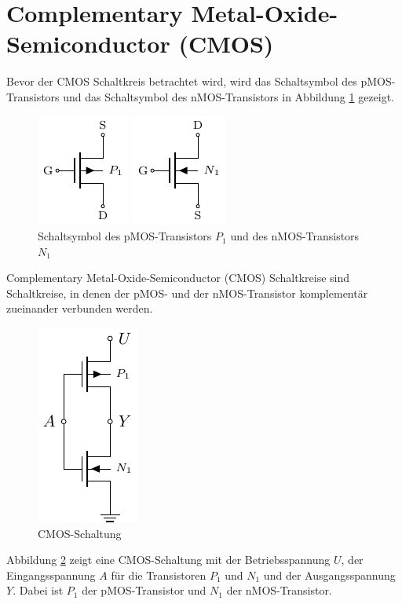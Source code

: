 \documentclass{scrarticle}
\numberwithin{equation}{section}
\begin{document}
\section{Complementary Metal-Oxide-Semiconductor (CMOS)}
\label{sec:cmos}
Bevor der CMOS Schaltkreis betrachtet wird, wird das Schaltsymbol des pMOS-Transistors und das Schaltsymbol des nMOS-Transistors in Abbildung \ref{fig:pmos-nmos} gezeigt.
\begin{figure}[ht]
	\centering
	\begin{minipage}[t]{0.45\textwidth}
		\centering
		\includegraphics[scale=2.2]{tkiz/pmos.pdf}
	\end{minipage}
	\hfill
	\begin{minipage}[t]{0.45\textwidth}
		\centering
		\includegraphics[scale=2.2]{tkiz/nmos.pdf}
	\end{minipage}
	\caption{Schaltsymbol des pMOS-Transistors $P_1$ und des nMOS-Transistors $N_1$}
	\label{fig:pmos-nmos}
\end{figure}

Complementary Metal-Oxide-Semiconductor (CMOS) Schaltkreise sind Schaltkreise, in denen der pMOS- und der nMOS-Transistor komplementär zueinander verbunden werden.
\begin{figure}[h]
	\centering
	\label{fig:cmos-not}
	\includegraphics[scale=1.7]{tkiz/cmos-not.pdf}
	\caption{CMOS-Schaltung}
\end{figure}
Abbildung \ref*{fig:cmos-not} zeigt eine CMOS-Schaltung mit der Betriebsspannung $U$, der Eingangsspannung $A$ für die Transistoren $P_1$ und $N_1$ und der Ausgangsspannung $Y$. Dabei ist $P_1$ der pMOS-Transistor und $N_1$ der nMOS-Transistor.
\end{document}

